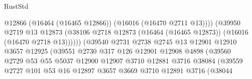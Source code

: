 \begin{lexlean}{RustStd}
\begin{coremodule}
                                              @12866
                                              (@16464 (@16465 @12866))
                                              (@16016 (@16470 @2711 @13))))
                                          (@39950
                                            @2719
                                            @13
                                            @12873
                                            (@38106
                                              @2718
                                              @12873
                                              (@16464 (@16465 @12873))
                                              (@16016 (@16470 @2718 @13))))))
                                      (@39540
                                        @2731
                                        @2738
                                        @2745
                                        @13
                                        @12901
                                        @12910
                                        @3657
                                        @12925
                                        (@39551
                                          @2730
                                          @317
                                          @126
                                          @12901
                                          @12908
                                          @4898
                                          (@39560
                                            @2729
                                            @53
                                            @55
                                            @5037
                                            @12900
                                            @12907
                                            @3710
                                            @12881
                                            @3716
                                            @38084
                                            (@39559
                                              @2727
                                              @101
                                              @53
                                              @16
                                              @12897
                                              @3657
                                              @3669
                                              @3710
                                              @12891
                                              @3716
                                              (@38044

\end{coremodule}
\end{lexlean}

